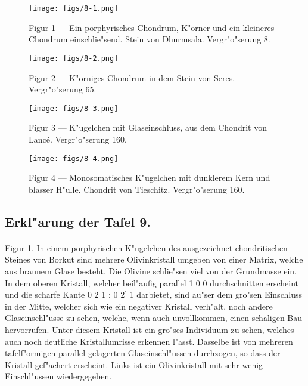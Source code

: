 \documentclass[a4paper, 11pt, oneside, polutonikogreek, german]{article}
\begin{document}
\vspace*{\fill}
\begin{figure}[H]
\centering
\texttt{[image: figs/8-1.png]}
\caption{\small Figur 1 --- Ein porphyrisches Chondrum, K"orner und ein kleineres Chondrum einschlie"send. Stein von Dhurmsala. Vergr"o"serung 8.}
\end{figure}
\vspace*{\fill}
\clearpage

\vspace*{\fill}
\begin{figure}[H]
\centering
\texttt{[image: figs/8-2.png]}
\caption{\small Figur 2 --- K"orniges Chondrum in dem Stein von Seres. Vergr"o"serung 65.}
\end{figure}
\vspace*{\fill}
\clearpage

\vspace*{\fill}
\begin{figure}[H]
\centering
\texttt{[image: figs/8-3.png]}
\caption{\small Figur 3 --- K"ugelchen mit Glaseinschluss, aus dem Chondrit von Lancé. Vergr"o"serung 160.}
\end{figure}
\vspace*{\fill}
\clearpage

\vspace*{\fill}
\begin{figure}[H]
\centering
\texttt{[image: figs/8-4.png]}
\caption{\small Figur 4 --- Monosomatisches K"ugelchen mit dunklerem Kern und blasser H"ulle. Chondrit von Tieschitz. Vergr"o"serung 160.}
\end{figure}
\vspace*{\fill}
\clearpage

\subsection{Erkl"arung der Tafel 9.}
\paragraph{}
Figur 1. In einem porphyrischen K"ugelchen des ausgezeichnet chondritischen Steines von Borkut sind mehrere Olivinkristall umgeben von einer Matrix, welche aus braunem Glase besteht. Die Olivine schlie"sen viel von der Grundmasse ein. In dem oberen Kristall, welcher beil"aufig parallel 1 0 0 durchschnitten erscheint und die scharfe Kante 0 2 1 : 0 2$^{\prime}$ 1 darbietet, sind au"ser dem gro"sen Einschluss in der Mitte, welcher sich wie ein negativer Kristall verh"alt, noch andere Glaseinschl"usse zu sehen, welche, wenn auch unvollkommen, einen schaligen Bau hervorrufen. Unter diesem Kristall ist ein gro"ses Individuum zu sehen, welches auch noch deutliche Kristallumrisse erkennen l"asst. Dasselbe ist von mehreren tafelf"ormigen parallel gelagerten Glaseinschl"ussen durchzogen, so dass der Kristall gef"achert erscheint. Links ist ein Olivinkristall mit sehr wenig Einschl"ussen wiedergegeben.
\end{document}
